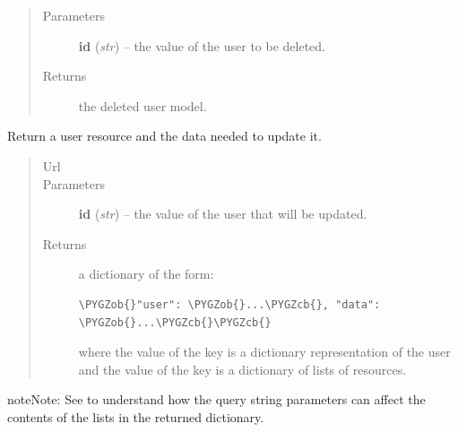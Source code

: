 \documentclass[letterpaper,10pt,english]{sphinxmanual}
\def\PYGZob{\char`\{}
\def\PYGZcb{\char`\}}
\begin{document}
\begin{fulllineitems}
\begin{fulllineitems}
\begin{quote}
\begin{description}
\item[{Parameters}] \leavevmode
\textbf{id} (\emph{str}) -- the  value of the user to be deleted.

\item[{Returns}] \leavevmode
the deleted user model.

\end{description}\end{quote}

\end{fulllineitems}


\begin{fulllineitems}
\label{api:onlinelinguisticdatabase.controllers.users.UsersController.edit}
Return a user resource and the data needed to update it.
\begin{quote}\begin{description}
\item[{Url }] \leavevmode
{}

\item[{Parameters}] \leavevmode
\textbf{id} (\emph{str}) -- the  value of the user that will be updated.

\item[{Returns}] \leavevmode

a dictionary of the form:

\begin{Verbatim}[commandchars=\\\{\}]
\PYGZob{}"user": \PYGZob{}...\PYGZcb{}, "data": \PYGZob{}...\PYGZcb{}\PYGZcb{}
\end{Verbatim}

where the value of the  key is a dictionary representation
of the user and the value of the  key is a dictionary of
lists of resources.


\end{description}\end{quote}

\begin{notice}{note}{Note:}
See  to understand how the query string
parameters can affect the contents of the lists in the returned
dictionary.
\end{notice}

\end{fulllineitems}


\end{fulllineitems}
\end{document}
